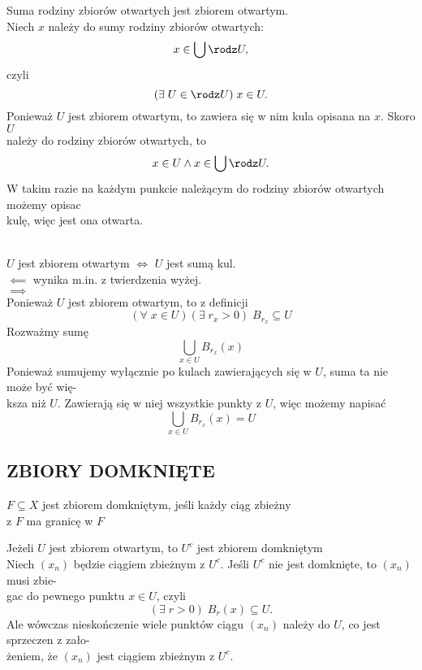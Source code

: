 \dowod
Suma rodziny zbiorów otwartych jest zbiorem otwartym.\medskip\\
Niech $x$ należy do sumy rodziny zbiorów otwartych:
$$x\in\bigcup \rodz U,$$
czyli
$$(\exists\;U\in\rodz U)\;x\in U.$$
Ponieważ $U$ jest zbiorem otwartym, to zawiera się w nim kula opisana na $x$. Skoro $U$ \\należy do rodziny zbiorów otwartych, to 
$$x\in U\land x\in\bigcup\rodz U.$$
W takim razie na każdym punkcie należącym do rodziny zbiorów otwartych możemy opisac \\kulę, więc jest ona otwarta.
\kondow

\bigskip\\
$U$ jest zbiorem otwartym $\iff$ $U$ jest sumą kul.\medskip\\

\dowod
$\impliedby$ wynika m.in. z twierdzenia wyżej.\medskip\\
$\implies$\smallskip\\
Ponieważ $U$ jest zbiorem otwartym, to z definicji
$$(\forall\;x\in U)(\exists\;r_x>0) \;B_{r_x}\subseteq U$$
Rozważmy sumę
$$\bigcup\limits_{x\in U}B_{r_x}(x)$$
Ponieważ sumujemy wyłącznie po kulach zawierających się w $U$, suma ta nie może być wię-\\ksza niż $U$. Zawierają się w niej wszystkie punkty z $U$, więc możemy napisać
$$\bigcup\limits_{x\in U}B_{r_x}(x)=U$$
\kondow

\subsection{ZBIORY DOMKNIĘTE}
\begin{center}\large
    $F\subseteq X$ jest {\color{def}zbiorem domkniętym}, jeśli każdy ciąg zbieżny \\z $F$ ma granicę w $F$
\end{center}\bigskip
Jeżeli $U$ jest zbiorem otwartym, to $U^c$ jest zbiorem domkniętym\medskip\\
\dowod
Niech $(x_n)$ będzie ciągiem zbieżnym z $U^c$. Jeśli $U^c$ nie jest domknięte, to $(x_n)$ musi zbie-\\gac do pewnego punktu $x\in U$, czyli
$$(\exists\;r>0)\;B_r(x)\subseteq U.$$
Ale wówczas nieskończenie wiele punktów ciągu $(x_n)$ należy do $U$, co jest sprzeczen z zało-\\żeniem, że $(x_n)$ jest ciągiem zbieżnym z $U^c$.
\kondow
